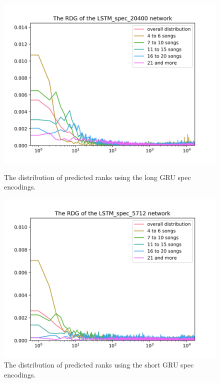 \begin{figure}[h]
\centering
\begin{minipage}{.5\textwidth}
  \centering
  \includegraphics[width=1\linewidth]{./img/lstm_spec_20400_graph.png}
  \caption{The distribution of predicted ranks using the long GRU spec encodings.}
  \label{fig:lstm_spec_20400_distribution}
\end{minipage}%
\begin{minipage}{.5\textwidth}
  \centering
  \includegraphics[width=1\linewidth]{./img/lstm_spec_5712_graph.png}
  \caption{The distribution of predicted ranks using the short GRU spec encodings.}
  \label{fig:lstm_spec_5712_distribution}
\end{minipage}
\end{figure}\label{fig:lstm_spec_distributions}

